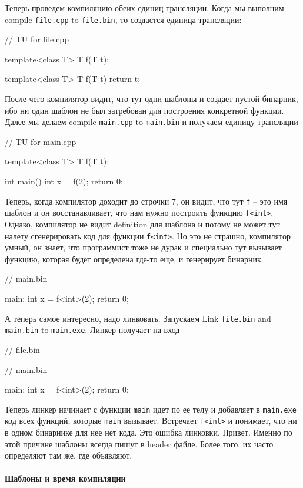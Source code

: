 Теперь проведем компиляцию обеих единиц трансляции.
Когда мы выполним compile \verb"file.cpp" to \verb"file.bin", то создастся единица трансляции:
\begin{cppcode}
// TU for file.cpp

template<class T>
T f(T t);

template<class T>
T f(T t) {
  return t;
}
\end{cppcode}
После чего компилятор видит, что тут одни шаблоны и создает пустой бинарник, ибо ни один шаблон не был затребован для построения конкретной функции.
Далее мы делаем compile \verb"main.cpp" to \verb"main.bin" и получаем единицу трансляции
\begin{cppcode}
// TU for main.cpp

template<class T>
T f(T t);

int main() {
  int x = f(2);
  return 0;
}
\end{cppcode}
Теперь, когда компилятор доходит до строчки 7, он видит, что тут \verb"f" -- это имя шаблон и он восстанавливает, что нам нужно построить функцию \verb"f<int>".
Однако, компилятор не видит definition для шаблона и потому не может тут налету сгенерировать код для функции \verb"f<int>".
Но это не страшно, компилятор умный, он знает, что программист тоже не дурак и специально тут вызывает функцию, которая будет определена где-то еще, и генерирует бинарник
\begin{cppcode}
// main.bin

main:
  int x = f<int>(2);
  return 0;
\end{cppcode}
А теперь самое интересно, надо линковать.
Запускаем Link \verb"file.bin" and \verb"main.bin" to \verb"main.exe".
Линкер получает на вход
\begin{cppcode}
// file.bin

// main.bin

main:
  int x = f<int>(2);
  return 0;
\end{cppcode}
Теперь линкер начинает с функции \verb"main" идет по ее телу и добавляет в \verb"main.exe" код всех функций, которые \verb"main" вызывает.
Встречает \verb"f<int>" и понимает, что ни в одном бинарнике для нее нет кода.
Это ошибка линковки.
Привет.
Именно по этой причине шаблоны всегда пишут в header файле.
Более того, их часто определяют там же, где объявляют.

\paragraph{Шаблоны и время компиляции}

